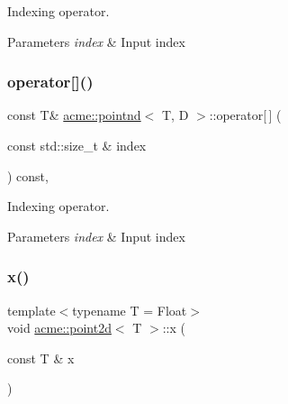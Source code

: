 Indexing operator. 


\begin{DoxyParams}{Parameters}
{\em index} & Input index \\
\hline
\end{DoxyParams}
\mbox{\label{classacme_1_1pointnd_a565e9ed195c8f8dadc570a029a3deb94}} 
\subsubsection{\texorpdfstring{operator[]()}{operator[]()}\hspace{0.1cm}{\footnotesize\ttfamily [2/2]}}
{\footnotesize\ttfamily const T\& \hyperlink{classacme_1_1pointnd}{acme\+::pointnd}$<$ T, D $>$\+::operator\mbox{[}$\,$\mbox{]} (\begin{DoxyParamCaption}\item[{const std\+::size\+\_\+t \&}]{index }\end{DoxyParamCaption}) const\hspace{0.3cm}{\ttfamily [inline]}, {\ttfamily [inherited]}}



Indexing operator. 


\begin{DoxyParams}{Parameters}
{\em index} & Input index \\
\hline
\end{DoxyParams}
\mbox{\label{classacme_1_1point2d_a158797a6603451c35bd0e2be3be3b2c8}} 
\subsubsection{\texorpdfstring{x()}{x()}}
{\footnotesize\ttfamily template$<$typename T = Float$>$ \\
void \hyperlink{classacme_1_1point2d}{acme\+::point2d}$<$ T $>$\+::x (\begin{DoxyParamCaption}\item[{const T \&}]{x }\end{DoxyParamCaption})\hspace{0.3cm}{\ttfamily [inline]}}



